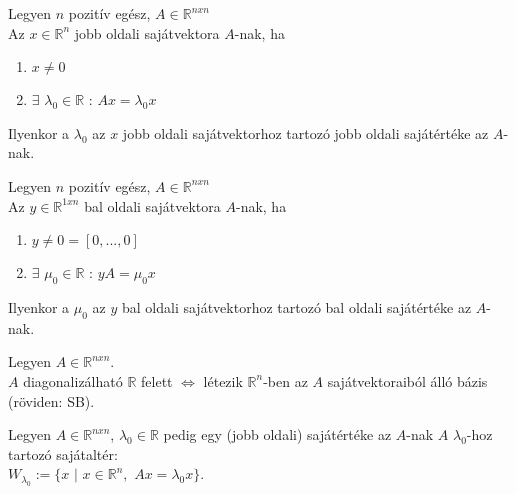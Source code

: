 	\begin{frame}
		\begin{tcolorbox}[title={Def.: Jobb oldali sajátvektor, sajátérték}]
			Legyen $n$ pozitív egész, $A \in \mathbb{R}^{n x n}$\\
			Az $x \in \mathbb{R}^{n}$ jobb oldali sajátvektora $A$-nak, ha\\

			\begin{enumerate}
			\item $x \neq 0$
			\item $\exists$ ${\lambda}_0 \in \mathbb{R}$  : $Ax = {\lambda}_0x$
			\end{enumerate}						
			
			Ilyenkor a ${\lambda}_0$ az $x$ jobb oldali sajátvektorhoz tartozó jobb oldali sajátértéke az $A$-nak. 
		\end{tcolorbox}	
		
		\begin{tcolorbox}[title={Def.: Bal oldali sajátvektor, sajátérték}]
			Legyen $n$ pozitív egész, $A \in \mathbb{R}^{n x n}$\\
			Az $y \in \mathbb{R}^{1xn}$ bal oldali sajátvektora $A$-nak, ha\\

			\begin{enumerate}
			\item $y \neq 0 = [0, ..., 0]$
			\item $\exists$ ${\mu}_0 \in \mathbb{R}$  : $yA = {\mu}_0x$
			\end{enumerate}						
			
			Ilyenkor a ${\mu}_0$ az $y$ bal oldali sajátvektorhoz tartozó bal oldali sajátértéke az $A$-nak. 
		\end{tcolorbox}	
		
		\begin{tcolorbox}[title={Tétel: Diagonizálhatóság, sajátvektor}]
			Legyen $A \in \mathbb{R}^{n x n}$.\\
			$A$ diagonalizálható $\mathbb{R}$ felett $\iff$ létezik $\mathbb{R}^n$-ben az $A$ sajátvektoraiból álló bázis (röviden: SB).
		\end{tcolorbox}	
		
		\begin{tcolorbox}[title={Def.: Sajátaltér}]
			Legyen $A \in \mathbb{R}^{n x n}$, ${\lambda}_0 \in \mathbb{R}$ pedig egy (jobb oldali) sajátértéke az $A$-nak $A$ ${\lambda}_0$-hoz tartozó sajátaltér:\\
			$W_{{\lambda}_0} := \{x$ $|$ $x \in \mathbb{R}^n,$ $Ax = {\lambda}_0x\}$.
		\end{tcolorbox}	
		

\end{frame}
